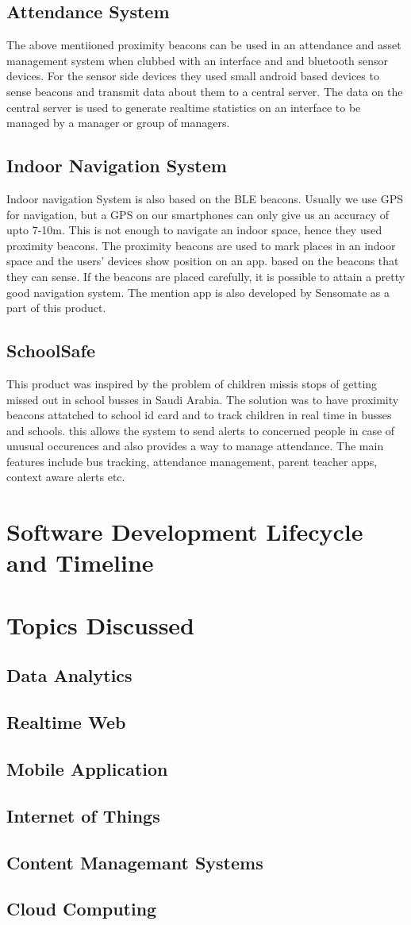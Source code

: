 \documentclass[a4paper,12pt]{report}
\begin{document}
			\subsection{Attendance System}
			The above mentiioned proximity beacons can be used in an attendance and asset management system when clubbed with an interface and and bluetooth sensor devices. For the sensor side devices they used small android based devices to sense beacons and transmit data about them to a central server. The data on the central server is used to generate realtime statistics on an interface to be managed by a manager or group of managers.
			\subsection{Indoor Navigation System}
			Indoor navigation System is also based on the BLE beacons. Usually we use GPS for navigation, but a GPS on our smartphones can only give us an accuracy of upto 7-10m. This is not enough to navigate an indoor space, hence they used proximity beacons. The proximity beacons are used to mark places in an indoor space and the users' devices show position on an app. based on the beacons that they can sense. If the beacons are placed carefully, it is possible to attain a pretty good navigation system. The mention app is also developed by Sensomate as a part of this product.
			\subsection{SchoolSafe}
			This product was inspired by the problem of children missis stops of getting missed out in school busses in Saudi Arabia. The solution was to have proximity beacons attatched to school id card and to track children in real time in busses and schools. this allows the system to send alerts to concerned people in case of unusual occurences and also provides a way to manage attendance. The main features include bus tracking, attendance management, parent teacher apps, context aware alerts etc.   
		\section{Software Development Lifecycle and Timeline}
		\section{Topics Discussed}
			\subsection{Data Analytics}
			\subsection{Realtime Web}
			\subsection{Mobile Application}
			\subsection{Internet of Things}
			\subsection{Content Managemant Systems}
			\subsection{Cloud Computing}
	
\end{document}
